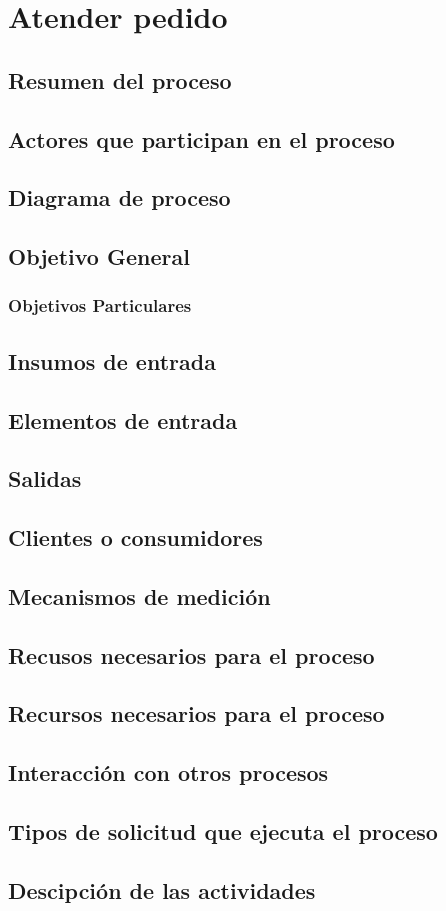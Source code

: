 \hypertarget{procesoAtenderPedido}{}
\section{Atender pedido}
\subsection{Resumen del proceso}
\subsection{Actores que participan en el proceso}
\subsection{Diagrama de proceso}
\subsection{Objetivo General}
\subsubsection{Objetivos Particulares}
\subsection{Insumos de entrada}
\subsection{Elementos de entrada}
\subsection{Salidas}
\subsection{Clientes o consumidores}
\subsection{Mecanismos de medici\'on}
\subsection{Recusos necesarios para el proceso}
\subsection{Recursos necesarios para el proceso}
\subsection{Interacci\'on con otros procesos}
\subsection{Tipos de solicitud que ejecuta el proceso}
\subsection{Descipci\'on de las actividades}